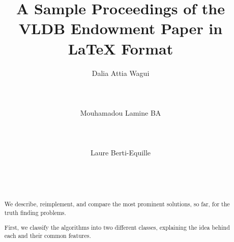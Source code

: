 \documentclass{vldb}
\begin{document}
\title{A Sample {\ttlit Proceedings of the VLDB Endowment} Paper in LaTeX
Format}


\author{
\alignauthor
Dalia Attia Wagui\\
       \affaddr{}\\
       \affaddr{}\\
       \affaddr{}\\
       \email{}
\alignauthor
Mouhamadou Lamine BA\\
       \\
       \\
       \\
\alignauthor 
Laure Berti-Equille\\
     \\
       \\
       \\
}%


\maketitle

\begin{abstract}
We describe, reimplement, and compare the most 
prominent solutions, so far, for the truth finding
problems.

First, we classify the algorithms into two different 
classes, explaining the idea behind each and their 
common features.

\end{abstract}
\end{document}
